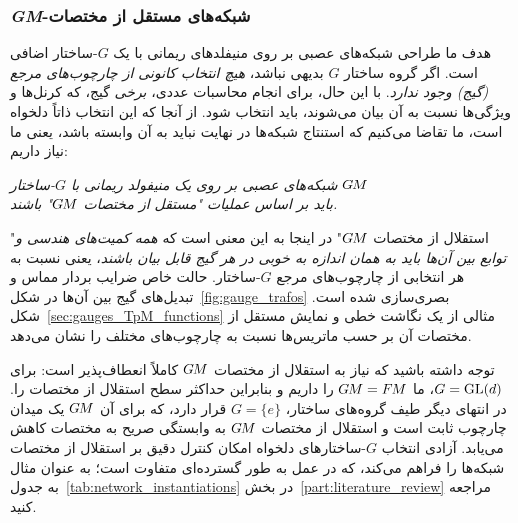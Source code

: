 		
		
		\subsubsection{\textit{GM}-شبکه‌های مستقل از مختصات}
		هدف ما
		طراحی شبکه‌های عصبی بر روی منیفلدهای ریمانی با یک $G$-ساختار اضافی است.
		اگر گروه ساختار $G$ بدیهی نباشد، \emph{هیچ انتخاب کانونی از چارچوب‌های مرجع (گیج) وجود ندارد}.
		با این حال، برای انجام محاسبات عددی، \emph{برخی} گیج، که کرنل‌ها و ویژگی‌ها نسبت به آن بیان می‌شوند، باید انتخاب شود.
		از آنجا که این انتخاب ذاتاً دلخواه است، ما تقاضا می‌کنیم که استنتاج شبکه‌ها در نهایت نباید به آن وابسته باشد، یعنی ما نیاز داریم:
		\begin{center}\it
			شبکه‌های عصبی بر روی یک منیفولد ریمانی با $G$-ساختار $G\mkern-1.4muM$ \\
			باید بر اساس عملیات "مستقل از مختصات $G\mkern-1.4muM$" باشند.
		\end{center}
		"استقلال از مختصات $G\mkern-1.4muM$" در اینجا به این معنی است که \emph{همه کمیت‌های هندسی و توابع بین آن‌ها باید به همان اندازه به خوبی در هر گیج قابل بیان باشند}، یعنی نسبت به هر انتخابی از چارچوب‌های مرجع $G$-ساختار.
		حالت خاص ضرایب بردار مماس و تبدیل‌های گیج بین آن‌ها در شکل~\ref{fig:gauge_trafos} بصری‌سازی شده است.
		شکل~\ref{sec:gauges_TpM_functions} مثالی از یک نگاشت خطی و نمایش مستقل از مختصات آن بر حسب ماتریس‌ها نسبت به چارچوب‌های مختلف را نشان می‌دهد.
		
		
		توجه داشته باشید که نیاز به استقلال از مختصات $G\mkern-1.4muM$ کاملاً انعطاف‌پذیر است:
		برای $G=\operatorname{GL}(d)$، ما $G\mkern-1.4muM=F\mkern-1.5muM$ را داریم و بنابراین حداکثر سطح استقلال از مختصات را.
		در انتهای دیگر طیف گروه‌های ساختار، $G=\{e\}$ قرار دارد، که برای آن $G\mkern-1.4muM$ یک میدان چارچوب ثابت است و استقلال از مختصات $G\mkern-1.4muM$ به وابستگی صریح به مختصات کاهش می‌یابد.
		آزادی انتخاب $G$-ساختارهای دلخواه امکان کنترل دقیق بر استقلال از مختصات شبکه‌ها را فراهم می‌کند،
		که در عمل به طور گسترده‌ای متفاوت است؛ به عنوان مثال به جدول~\ref{tab:network_instantiations} در بخش~\ref{part:literature_review} مراجعه کنید.
		
